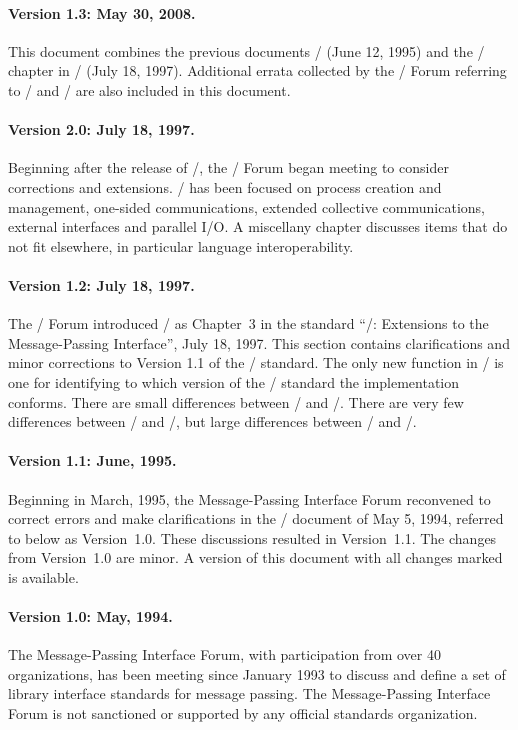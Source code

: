\paragraph*{Version 1.3: May 30, 2008.}
This document combines the previous 
documents \mpiidoti/ (June 12, 1995) and the \mpiidotii/ chapter in \mpiii/ 
(July 18, 1997). Additional errata collected by the \mpi/ Forum 
referring to \mpiidoti/ and \mpiidotii/ are also included in this 
document.

\paragraph*{Version 2.0: July 18, 1997.}
Beginning after the release of 
\mpiidoti/, the \mpi/ Forum began meeting to consider corrections and 
extensions. \mpiii/ has been focused on process creation and 
management, one-sided communications, extended collective 
communications, external interfaces and parallel I/O. A miscellany 
chapter discusses items that do not fit elsewhere, in particular 
language interoperability.

\paragraph*{Version 1.2: July 18, 1997.}
The \mpiii/ Forum introduced \mpiidotii/ as 
Chapter~3 
in the standard ``\mpiii/: Extensions to the Message-Passing
Interface'', July 18, 1997.  This section contains clarifications 
and minor corrections to Version 1.1 of the \mpi/ standard. The only 
new function in \mpiidotii/ is one for identifying to which version of 
the \mpi/ standard the implementation conforms. There are small 
differences between \mpii/ and \mpiidoti/. There are very few differences 
between \mpiidoti/ and \mpiidotii/, but large differences between \mpiidotii/
and \mpiii/.

\paragraph*{Version 1.1: June, 1995.}
Beginning in March, 1995, the Message-Passing Interface Forum reconvened to 
correct errors and make clarifications in the \mpi/ document of May 5, 1994,
referred to below as Version~1.0.  These discussions resulted in 
Version~1.1.  The changes from Version~1.0 are minor.  A version
of this document with all changes marked is available.  

\paragraph*{Version 1.0:  May, 1994.}
The Message-Passing Interface Forum, with participation from over
40 organizations, has been meeting since January 1993 to discuss and
define a set of library interface standards for message
passing.
The Message-Passing Interface Forum
is not sanctioned or supported by any official
standards organization.

